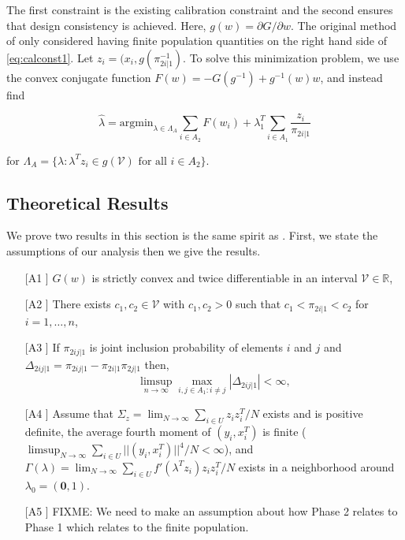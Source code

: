 \documentclass[12pt]{article}
\newcommand{\argmin}{{\text{argmin}}}
\newcommand{\R}{\mathbb{R}}
\renewcommand{\bf}[1]{\mathbf{#1}}
\begin{document}
The first constraint is the existing calibration constraint and the second
ensures that design consistency is achieved. Here, $g(w) = \partial G / \partial
w$. The original method of \cite{kwon2024debiased} only considered having finite
population quantities on the right hand side of \ref{eq:calconst1}. Let $z_i =
(x_i, g(\pi_{2i|1}^{-1})$. To solve this minimization problem, we use the convex
conjugate function $F(w) = -G(g^{-1}) + g^{-1}(w)w$, and instead find

$$ \hat \lambda = \argmin_{\lambda \in \Lambda_A} \sum_{i \in A_2} F(w_i) +
\lambda_1^T \sum_{i \in A_1} \frac{z_i}{\pi_{2i|1}}$$

for $\Lambda_A = \{\lambda: \lambda^T z_i \in g(\mathcal{V}) \text{ for all } i
\in A_2\}$.

\subsection*{Theoretical Results}

We prove two results in this section is the same spirit as \cite{kwon2024debiased}.
First, we state the assumptions of our analysis then we give the results.

\begin{itemize}
  \item[[A1]] $G(w)$ is strictly convex and twice differentiable in an interval
    $\mathcal{V} \in \R$,
  \item[[A2]] There exists $c_1, c_2 \in \mathcal{V}$ with $c_1, c_2 > 0$ such
    that $c_1 < \pi_{2i|1} < c_2$ for $i = 1, \dots, n$,
  \item[[A3]] If $\pi_{2ij|1}$ is joint inclusion probability of elements $i$
    and $j$ and $\Delta_{2ij|1} = \pi_{2ij|1} - \pi_{2i|1}\pi_{2j|1}$ then,
    $$\limsup_{n \to \infty} \max_{i,j \in A_1: i \neq j} |\Delta_{2ij|1}| <
    \infty,$$
  \item[[A4]] Assume that $\Sigma_z = \lim_{N \to \infty} \sum_{i \in U} z_i
    z_i^T/N$ exists and is positive definite, the average fourth moment of $(y_i,
    x_i^T)$ is finite ($\limsup_{N \to \infty} \sum_{i \in U} ||(y_i, x_i^T)||^4
    / N < \infty$), and $\Gamma(\lambda) = \lim_{N \to \infty}  \sum_{i \in U}
    f'(\lambda^T z_i) z_i z_i^T / N$ exists in a neighborhood around $\lambda_0
    = (\bf 0, 1)$.
  \item[[A5]] FIXME: We need to make an assumption about how Phase 2 relates to
    Phase 1 which relates to the finite population.
\end{itemize}
\end{document}
